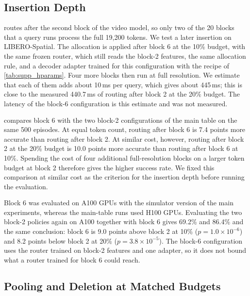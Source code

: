 \subsection{Insertion Depth}
\label{sec:supp_depth}



\method routes after the second block of the video model, so only two of the 20 blocks that a query runs process the full 19,200 tokens.
We test a later insertion on LIBERO-Spatial.
The allocation is applied after block 6 at the 10\% budget, with the same frozen router, which still reads the block-2 features, the same allocation rule, and a decoder adapter trained for this configuration with the recipe of \cref{tab:supp_hparams}.
Four more blocks then run at full resolution.
We estimate that each of them adds about 10\,ms per query, which gives about 445\,ms; this is close to the measured 440.7\,ms of routing after block 2 at the 20\% budget.
The latency of the block-6 configuration is this estimate and was not measured.

 compares block 6 with the two block-2 configurations of the main table on the same 500 episodes.
At equal token count, routing after block 6 is 7.4 points more accurate than routing after block 2.
At similar cost, however, routing after block 2 at the 20\% budget is 10.0 points more accurate than routing after block 6 at 10\%.
Spending the cost of four additional full-resolution blocks on a larger token budget at block 2 therefore gives the higher success rate.
We fixed this comparison at similar cost as the criterion for the insertion depth before running the evaluation.

Block 6 was evaluated on A100 GPUs with the simulator version of the main experiments, whereas the main-table runs used H100 GPUs.
Evaluating the two block-2 policies again on A100 together with block 6 gives 69.2\% and 86.4\% and the same conclusion: block 6 is 9.0 points above block 2 at 10\% ($p=1.0\times10^{-6}$) and 8.2 points below block 2 at 20\% ($p=3.8\times10^{-5}$).
The block-6 configuration uses the router trained on block-2 features and one adapter, so it does not bound what a router trained for block 6 could reach.

\subsection{Pooling and Deletion at Matched Budgets}
\label{sec:supp_operator_comparison}

